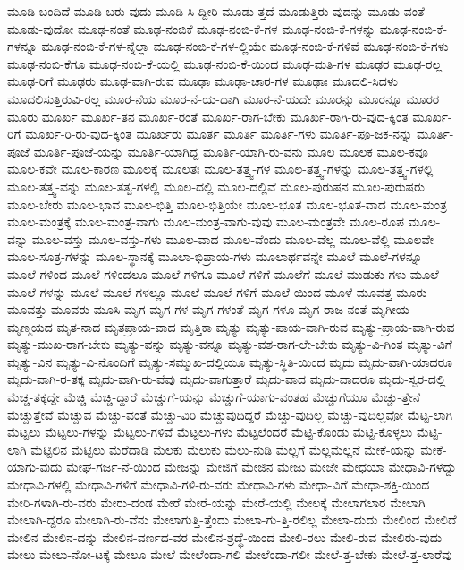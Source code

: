 {ಮೂಡಿ-ಬಂದಿದೆ
ಮೂಡಿ-ಬರು-ವುದು
ಮೂಡಿ-ಸಿ-ದ್ದೀರಿ
ಮೂಡು-ತ್ತದೆ
ಮೂಡುತ್ತಿರು-ವುದನ್ನು
ಮೂಡು-ವಂತೆ
ಮೂಡು-ವುದೋ
ಮೂಢ-ನಂತೆ
ಮೂಢ-ನಂಬಿಕೆ
ಮೂಢ-ನಂಬಿ-ಕೆ-ಗಳ
ಮೂಢ-ನಂಬಿ-ಕೆ-ಗಳನ್ನು
ಮೂಢ-ನಂಬಿ-ಕೆ-ಗಳನ್ನೂ
ಮೂಢ-ನಂಬಿ-ಕೆ-ಗಳ-ನ್ನೆಲ್ಲಾ
ಮೂಢ-ನಂಬಿ-ಕೆ-ಗಳ-ಲ್ಲಿಯೇ
ಮೂಢ-ನಂಬಿ-ಕೆ-ಗಳಿವೆ
ಮೂಢ-ನಂಬಿ-ಕೆ-ಗಳು
ಮೂಢ-ನಂಬಿ-ಕೆಗೂ
ಮೂಢ-ನಂಬಿ-ಕೆ-ಯಲ್ಲಿ
ಮೂಢ-ನಂಬಿ-ಕೆ-ಯಿಂದ
ಮೂಢ-ಮತಿ-ಗಳ
ಮೂಢರ
ಮೂಢ-ರಲ್ಲ
ಮೂಢ-ರಿಗೆ
ಮೂಢರು
ಮೂಢ-ವಾಗಿ-ರುವ
ಮೂಢಾ
ಮೂಢಾ-ಚಾರ-ಗಳ
ಮೂಢಾಃ
ಮೂದಲಿ-ಸಿದಳು
ಮೂದಲಿಸುತ್ತಿರುವಿ-ರಲ್ಲ
ಮೂರ-ನೆಯ
ಮೂರ-ನೆ-ಯ-ದಾಗಿ
ಮೂರ-ನೆ-ಯದೇ
ಮೂರನ್ನು
ಮೂರನ್ನೂ
ಮೂರರ
ಮೂರು
ಮೂರ್ಖ
ಮೂರ್ಖ-ತನ
ಮೂರ್ಖ-ರಂತೆ
ಮೂರ್ಖ-ರಾಗ-ಬೇಕು
ಮೂರ್ಖ-ರಾಗಿ-ರು-ವುದ-ಕ್ಕಿಂತ
ಮೂರ್ಖ-ರಿಗೆ
ಮೂರ್ಖ-ರಿ-ರು-ವುದ-ಕ್ಕಿಂತ
ಮೂರ್ಖರು
ಮೂರ್ತ
ಮೂರ್ತಿ
ಮೂರ್ತಿ-ಗಳು
ಮೂರ್ತಿ-ಪೂ-ಜಕ-ನನ್ನು
ಮೂರ್ತಿ-ಪೂಜೆ
ಮೂರ್ತಿ-ಪೂಜೆ-ಯನ್ನು
ಮೂರ್ತಿ-ಯಾಗಿದ್ದ
ಮೂರ್ತಿ-ಯಾಗಿ-ರು-ವನು
ಮೂಲ
ಮೂಲಕ
ಮೂಲ-ಕವೂ
ಮೂಲ-ಕವೇ
ಮೂಲ-ಕಾರಣ
ಮೂಲಕ್ಕೆ
ಮೂಲತಃ
ಮೂಲ-ತತ್ತ್ವ-ಗಳ
ಮೂಲ-ತತ್ತ್ವ-ಗಳನ್ನು
ಮೂಲ-ತತ್ತ್ವ-ಗಳಲ್ಲಿ
ಮೂಲ-ತತ್ತ್ವ-ವನ್ನು
ಮೂಲ-ತತ್ವ-ಗಳಲ್ಲಿ
ಮೂಲ-ದಲ್ಲಿ
ಮೂಲ-ದಲ್ಲಿವೆ
ಮೂಲ-ಪುರುಷನ
ಮೂಲ-ಪುರುಷರು
ಮೂಲ-ಬೇರು
ಮೂಲ-ಭಾವ
ಮೂಲ-ಭಿತ್ತಿ
ಮೂಲ-ಭಿತ್ತಿಯೇ
ಮೂಲ-ಭೂತ
ಮೂಲ-ಭೂತ-ವಾದ
ಮೂಲ-ಮಂತ್ರ
ಮೂಲ-ಮಂತ್ರಕ್ಕೆ
ಮೂಲ-ಮಂತ್ರ-ವಾಗು
ಮೂಲ-ಮಂತ್ರ-ವಾಗು-ವುವು
ಮೂಲ-ಮಂತ್ರವೇ
ಮೂಲ-ರೂಪ
ಮೂಲ-ವನ್ನು
ಮೂಲ-ವಸ್ತು
ಮೂಲ-ವಸ್ತು-ಗಳು
ಮೂಲ-ವಾದ
ಮೂಲ-ವೆಂದು
ಮೂಲ-ವೆಲ್ಲ
ಮೂಲ-ವೆಲ್ಲಿ
ಮೂಲವೇ
ಮೂಲ-ಸೂತ್ರ-ಗಳನ್ನು
ಮೂಲ-ಸ್ಥಾನಕ್ಕೆ
ಮೂಲಾ-ಭಿಪ್ರಾಯ-ಗಳು
ಮೂಲಾರ್ಥವನ್ನೇ
ಮೂಲೆ
ಮೂಲೆ-ಗಳನ್ನೂ
ಮೂಲೆ-ಗಳಿಂದ
ಮೂಲೆ-ಗಳಿಂದಲೂ
ಮೂಲೆ-ಗಳಿಗೂ
ಮೂಲೆ-ಗಳಿಗೆ
ಮೂಲೆಗೆ
ಮೂಲೆ-ಮುಡುಕು-ಗಳು
ಮೂಲೆ-ಮೂಲೆ-ಗಳನ್ನು
ಮೂಲೆ-ಮೂಲೆ-ಗಳಲ್ಲೂ
ಮೂಲೆ-ಮೂಲೆ-ಗಳಿಗೆ
ಮೂಲೆ-ಯಿಂದ
ಮೂಳೆ
ಮೂವತ್ತ-ಮೂರು
ಮೂವತ್ತು
ಮೂವರು
ಮೂಸಿ
ಮೃಗ
ಮೃಗ-ಗಳ
ಮೃಗ-ಗಳಂತೆ
ಮೃಗ-ಗಳೂ
ಮೃಗ-ರಾಜ-ನಂತೆ
ಮೃಗೀಯ
ಮೃಣ್ಮಯದ
ಮೃತ-ನಾದ
ಮೃತಪ್ರಾಯ-ವಾದ
ಮೃತ್ತಿಕಾ
ಮೃತ್ಯು
ಮೃತ್ಯು-ಪಾಯ-ವಾಗಿ-ರುವ
ಮೃತ್ಯು-ಪ್ರಾಯ-ವಾಗಿ-ರುವ
ಮೃತ್ಯು-ಮುಖ-ರಾಗ-ಬೇಕು
ಮೃತ್ಯು-ವನ್ನು
ಮೃತ್ಯು-ವನ್ನೂ
ಮೃತ್ಯು-ವಶ-ರಾಗ-ಲೇ-ಬೇಕು
ಮೃತ್ಯು-ವಿ-ಗಿಂತ
ಮೃತ್ಯು-ವಿಗೆ
ಮೃತ್ಯು-ವಿನ
ಮೃತ್ಯು-ವಿ-ನೊಂದಿಗೆ
ಮೃತ್ಯು-ಸಮ್ಮುಖ-ದಲ್ಲಿಯೂ
ಮೃತ್ಯು-ಸ್ಥಿತಿ-ಯಿಂದ
ಮೃದು
ಮೃದು-ವಾಗಿ-ಯಾದರೂ
ಮೃದು-ವಾಗಿ-ರ-ತಕ್ಕ
ಮೃದು-ವಾಗಿ-ರು-ವೆವು
ಮೃದು-ವಾಗುತ್ತಾರೆ
ಮೃದು-ವಾದ
ಮೃದು-ವಾದರೂ
ಮೃದು-ಸ್ವರ-ದಲ್ಲಿ
ಮೆಚ್ಚ-ತಕ್ಕದ್ದೇ
ಮೆಚ್ಚಿ
ಮೆಚ್ಚಿ-ದ್ದಾರೆ
ಮೆಚ್ಚುಗೆ-ಯನ್ನು
ಮೆಚ್ಚುಗೆ-ಯಾಗು-ವಂತಹ
ಮೆಚ್ಚುಗೆಯೂ
ಮೆಚ್ಚು-ತ್ತೇನೆ
ಮೆಚ್ಚುತ್ತೇವೆ
ಮೆಚ್ಚುವ
ಮೆಚ್ಚು-ವಂತೆ
ಮೆಚ್ಚು-ವಿರಿ
ಮೆಚ್ಚುವುದಿದ್ದರೆ
ಮೆಚ್ಚು-ವುದಿಲ್ಲ
ಮೆಚ್ಚು-ವುದಿಲ್ಲವೋ
ಮೆಟ್ಟ-ಲಾಗಿ
ಮೆಟ್ಟಲು
ಮೆಟ್ಟಲು-ಗಳನ್ನು
ಮೆಟ್ಟಲು-ಗಳಿವೆ
ಮೆಟ್ಟಲು-ಗಳು
ಮೆಟ್ಟಲೆಂದರೆ
ಮೆಟ್ಟಿ-ಕೊಂಡು
ಮೆಟ್ಟಿ-ಕೊಳ್ಳಲು
ಮೆಟ್ಟಿ-ಲಾಗಿ
ಮೆಟ್ಟಿಲಿನ
ಮೆಟ್ಟಿಲು
ಮೆರೆದಾಡಿ
ಮೆಲಕು
ಮೆಲುಕು
ಮೆಲು-ನುಡಿ
ಮೆಲ್ಲಗೆ
ಮೆಲ್ಲಮೆಲ್ಲನೆ
ಮೇಕೆ-ಯನ್ನು
ಮೇಕೆ-ಯಾಗು-ವುದು
ಮೇಘ-ಗರ್ಜ-ನೆ-ಯಿಂದ
ಮೇಜನ್ನು
ಮೇಜಿಗೆ
ಮೇಜಿನ
ಮೇಜು
ಮೇಜೇ
ಮೇಧಯಾ
ಮೇಧಾವಿ-ಗಳದ್ದು
ಮೇಧಾವಿ-ಗಳಲ್ಲಿ
ಮೇಧಾವಿ-ಗಳಿಗೆ
ಮೇಧಾವಿ-ಗಳಿ-ರು-ವರು
ಮೇಧಾವಿ-ಗಳು
ಮೇಧಾ-ವಿಗೆ
ಮೇಧಾ-ಶಕ್ತಿ-ಯಿಂದ
ಮೇರಿ-ಗಳಾಗಿ-ರು-ವರು
ಮೇರು-ದಂಡ
ಮೇರೆ
ಮೇರೆ-ಯನ್ನು
ಮೇರೆ-ಯಲ್ಲಿ
ಮೇಲಕ್ಕೆ
ಮೇಲಾಗಲಾರ
ಮೇಲಾಗಿ
ಮೇಲಾಗಿ-ದ್ದರೂ
ಮೇಲಾಗಿ-ರು-ವೆನು
ಮೇಲಾಗುತ್ತಿ-ತ್ತೆಂದು
ಮೇಲಾ-ಗು-ತ್ತಿ-ರಲಿಲ್ಲ
ಮೇಲಾ-ದುದು
ಮೇಲಿಂದ
ಮೇಲಿದೆ
ಮೇಲಿನ
ಮೇಲಿನ-ದನ್ನು
ಮೇಲಿನ-ವರ್ಣದ-ವರ
ಮೇಲಿನ-ಶ್ರದ್ಧೆ-ಯಿಂದ
ಮೇಲಿ-ರಲು
ಮೇಲಿ-ರುವ
ಮೇಲಿರು-ವುದು
ಮೇಲು
ಮೇಲು-ನೋ-ಟಕ್ಕೆ
ಮೇಲೂ
ಮೇಲೆ
ಮೇಲೆಂದಾ-ಗಲಿ
ಮೇಲೆಂದಾ-ಗಲೀ
ಮೇಲೆ-ತ್ತ-ಬೇಕು
ಮೇಲೆ-ತ್ತ-ಲಾರೆವು
}
